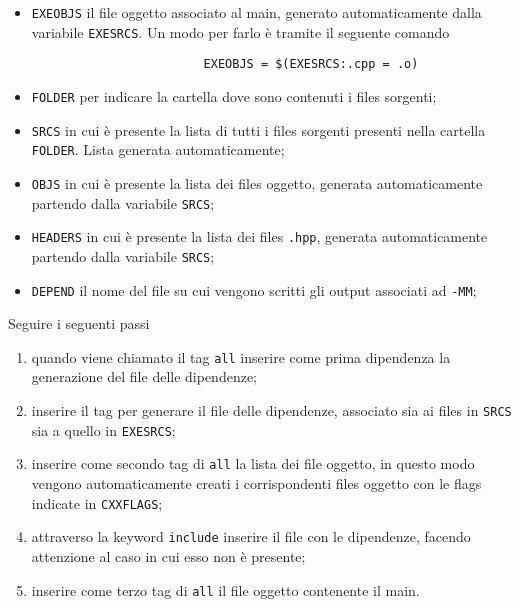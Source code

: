 \begin{enumerate}
\begin{itemize}
                \item \texttt{EXEOBJS} il file oggetto associato al main, generato automaticamente dalla variabile \texttt{EXESRCS}. Un modo per farlo \`e tramite il seguente comando
                    \begin{verbatim}
                        EXEOBJS = $(EXESRCS:.cpp = .o)
                    \end{verbatim}
                \item \texttt{FOLDER} per indicare la cartella dove sono contenuti i files sorgenti;
                \item \texttt{SRCS} in cui \`e presente la lista di tutti i files sorgenti presenti nella cartella \texttt{FOLDER}. Lista generata automaticamente;
                \item \texttt{OBJS} in cui \`e presente la lista dei files oggetto, generata automaticamente partendo dalla variabile \texttt{SRCS};
                \item \texttt{HEADERS} in cui \`e presente la lista dei files \texttt{.hpp}, generata automaticamente partendo dalla variabile \texttt{SRCS};
                \item \texttt{DEPEND} il nome del file su cui vengono scritti gli output associati ad \texttt{-MM};
            \end{itemize}
            Seguire i seguenti passi
            \begin{enumerate}
                \item quando viene chiamato il tag \texttt{all} inserire come prima dipendenza la generazione del file delle dipendenze;
                \item inserire il tag per generare il file delle dipendenze, associato sia ai files in \texttt{SRCS} sia a quello in \texttt{EXESRCS};
                \item inserire come secondo tag di \texttt{all} la lista dei file oggetto, in questo modo vengono automaticamente creati i corrispondenti files oggetto con le flags indicate in \texttt{CXXFLAGS};
                \item attraverso la keyword \texttt{include} inserire il file con le dipendenze, facendo attenzione al caso in cui esso non \`e presente;
                \item inserire come terzo tag di \texttt{all} il file oggetto contenente il main.
            \end{enumerate}


\end{enumerate}
